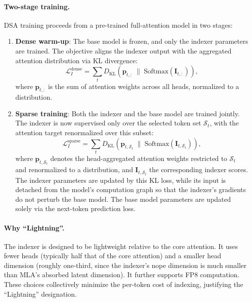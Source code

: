 \documentclass{article}
\begin{document}
\paragraph{Two-stage training.}
\label{sec:dsa_training}
DSA training proceeds from a pre-trained full-attention model in two stages:
\begin{enumerate}
\item \textbf{Dense warm-up}: The base model is frozen, and only the indexer parameters are trained. The objective aligns the indexer output with the aggregated attention distribution via KL divergence:
\begin{equation}
\label{eq:warmup_loss}
\mathcal{L}_I^{\text{dense}} = \sum_t D_{\mathrm{KL}}\!\left(\mathbf{p}_{t,:} \;\|\; \mathrm{Softmax}(\mathbf{I}_{t,:})\right),
\end{equation}
where $\mathbf{p}_{t,:}$ is the sum of attention weights across all heads, normalized to a distribution.

\item \textbf{Sparse training}: Both the indexer and the base model are trained jointly. The indexer is now supervised only over the selected token set $\mathcal{S}_t$, with the attention target renormalized over this subset:
\begin{equation}
\label{eq:sparse_loss}
\mathcal{L}_I^{\text{sparse}} = \sum_t D_{\mathrm{KL}}\!\left(\mathbf{p}_{t,\mathcal{S}_t} \;\big\|\; \mathrm{Softmax}\!\left(\mathbf{I}_{t,\mathcal{S}_t}\right)\right),
\end{equation}
where $\mathbf{p}_{t,\mathcal{S}_t}$ denotes the head-aggregated attention weights restricted to $\mathcal{S}_t$ and renormalized to a distribution, and $\mathbf{I}_{t,\mathcal{S}_t}$ the corresponding indexer scores. The indexer parameters are updated by this KL loss, while its input is detached from the model's computation graph so that the indexer's gradients do not perturb the base model. The base model parameters are updated solely via the next-token prediction loss.
\end{enumerate}

\paragraph{Why ``Lightning''.}
The indexer is designed to be lightweight relative to the core attention. It uses fewer heads (typically half that of the core attention) and a smaller head dimension (roughly one-third, since the indexer's nope dimension is much smaller than MLA's absorbed latent dimension). It further supports FP8 computation. These choices collectively minimize the per-token cost of indexing, justifying the ``Lightning'' designation.
\end{document}
